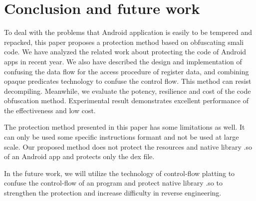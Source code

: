 \section{Conclusion and future work}
To deal with the problems that Android application is easily to be tempered and repacked, this paper proposes a protection method based on obfuscating smali code. We have analyzed the related work about protecting the code of Android apps in recent year. We also have described the design and implementation of confusing the data flow for the access procedure of register data, and combining opaque predicates technology to confuse the control flow. This method can resist decompiling. Meanwhile, we evaluate the potency, resilience and cost of the code obfuscation method. Experimental result demonstrates excellent performance of the effectiveness and low cost.

The protection method presented in this paper has some limitations as well. It can only be used some specific instructions formant and not be used at large scale. Our proposed method does not protect the resources and native library .so of an Android app and protects only the dex file.

In the future work, we will utilize the technology of control-flow platting to confuse the control-flow of an program and protect native library .so to strengthen the protection and increase difficulty in reverse engineering.